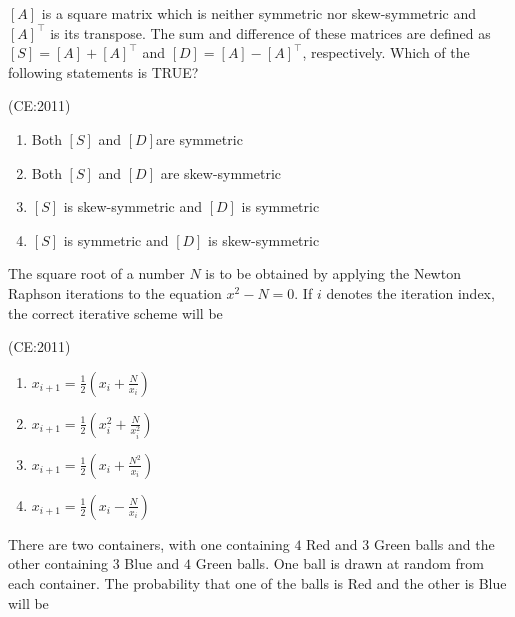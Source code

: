 \item 
	 $[A]$ is a square matrix which is neither symmetric nor skew-symmetric and $[A]^\top$ is its transpose. The sum and difference of these matrices are defined as $[S] = [A] + [A]^\top$ and $[D] = [A] - [A]^\top$, respectively. Which of the following statements is TRUE?

		\hfill (CE:2011)
    
        \begin{enumerate}
            \item Both $[S]$ and $[D]$are symmetric
            \item Both $[S]$ and $[D]$ are skew-symmetric
            \item $[S]$ is skew-symmetric and $[D]$ is symmetric
            \item $[S]$ is symmetric and $[D]$ is skew-symmetric
        \end{enumerate}
\vspace{1cm}
    \item 
	    The square root of a number $N$ is to be obtained by applying the Newton Raphson iterations to the equation $x^2 - N = 0$. If $i$ denotes the iteration index, the correct iterative scheme will be

		\hfill (CE:2011)
    \begin{multicols}{2}
	    \begin{enumerate}
            \item $x_{i+1} = \frac{1}{2} \left( x_i + \frac{N}{x_i} \right)$
            \item $x_{i+1} = \frac{1}{2} \left( x_i^2 + \frac{N}{x_i^2} \right)$
            \item $x_{i+1} = \frac{1}{2} \left( x_i + \frac{N^2}{x_i} \right)$
            \item $x_{i+1} = \frac{1}{2} \left( x_i - \frac{N}{x_i} \right)$
        \end{enumerate}
    \end{multicols}

    \item
	    There are two containers, with one containing $4$ Red and $3$ Green balls and the other containing $3$ Blue and $4$ Green balls. One ball is drawn at random from each container. The probability that one of the balls is Red and the other is Blue will be

